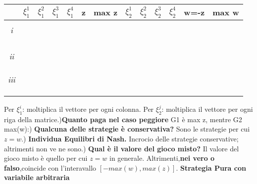\documentclass{article}
\theoremstyle{definition}
\theoremstyle{remark}
\begin{document}
\begin{center}
    \begin{tabular}{|c|c |c |c |c |c |c |c |c |c |c |c | c|}
     \hline
     &\(\xi _1^1\) & \(\xi_1^2\) & \(\xi_1^3\) & \(\xi_1^4\) & z & max z & \(\xi_2^1\) & \(\xi_2^2\) & \(\xi_2^3\) & \(\xi_2^4\) & w=-z & max w\\ [0.5ex] 
     \hline
      & & & & & & & & & & & &\\
      \hline
      \emph{i}& & & & & & & & & & & &\\
      \hline
       & & & & & & & & & & & &\\
      \hline
      & & & & & & & & & & & &\\
      \hline\hline
      & & & & & & & & & & & &\\
      \hline
      & & & & & & & & & & & &\\
       \hline
       \emph{ii}& & & & & & & & & & & &\\
       & & & & & & & & & & & &\\
      \hline
      & & & & & & & & & & & &\\
       \hline\hline
      & & & & & & & & & & & &\\
       \hline
       \emph{iii} & & & & & & & & & & & &\\
       & & & & & & & & & & & &\\
      \hline
      & & & & & & & & & & & &\\
       \hline
      & & & & & & & & & & & &\\
      \hline
    \end{tabular}
    \end{center}
Per \(\xi_1^i\): moltiplica il vettore per ogni colonna.\newline
Per \(\xi_2^j\): moltiplica il vettore per ogni riga della matrice.)\textbf{Quanto paga nel caso peggiore} G1 è max z, mentre G2 max(w):) \textbf{Qualcuna delle strategie è conservativa?} Sono le strategie per cui \(z=w\).) \textbf{ Individua Equilibri di Nash.} Incrocio delle strategie conservative; altrimenti non ve ne sono.) \textbf{Qual è il valore del gioco misto?} Il valore del gioco misto è quello per cui \(z=w\) in generale. Altrimenti,\textbf{nei vero o falso},coincide con l'interavallo \([-max(w),max(z)]\).\newline
\textbf{Strategia Pura con variabile arbitraria}
\end{document}
